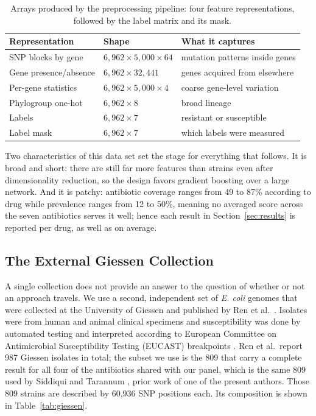 \documentclass[journal]{IEEEtran}
\begin{document}
\begin{table}[!tb]
\caption{Arrays produced by the preprocessing pipeline: four feature
representations, followed by the label matrix and its mask.}
\label{tab:views}
\centering
\footnotesize
\setlength{\tabcolsep}{2pt}
\renewcommand{\arraystretch}{1.05}
\begin{tabular}{|l|l|>{\raggedright\arraybackslash}p{2.0cm}|}
\hline
\rowcolor{headgrey}
\textbf{Representation} & \textbf{Shape} & \textbf{What it captures} \\ \hline
SNP blocks by gene    & $6{,}962 \times 5{,}000 \times 64$ & mutation patterns inside genes \\ \hline
Gene presence/absence & $6{,}962 \times 32{,}441$          & genes acquired from elsewhere \\ \hline
Per-gene statistics   & $6{,}962 \times 5{,}000 \times 4$  & coarse gene-level variation \\ \hline
Phylogroup one-hot    & $6{,}962 \times 8$                 & broad lineage \\ \hline
Labels                & $6{,}962 \times 7$                 & resistant or susceptible \\ \hline
Label mask            & $6{,}962 \times 7$                 & which labels were measured \\ \hline
\end{tabular}
\renewcommand{\arraystretch}{1.0}
\end{table}

Two characteristics of this data set set the stage for everything that follows. It
is broad and short: there are still far more features than strains even after
dimensionality reduction, so the design favors gradient boosting over a large
network. And it is patchy: antibiotic coverage ranges from 49 to 87\%
according to drug while prevalence ranges from 12 to 50\%, meaning no
averaged score across the seven antibiotics serves it well; hence each result in
Section~\ref{sec:results} is reported per drug, as well as on average.

\subsection{The External Giessen Collection}

A single collection does not provide an answer to the question of whether or not an
approach travels. We use a second, independent set of \textit{E. coli} genomes that
were collected at the University of Giessen and published by Ren et al.\
\cite{Ren2022}. Isolates were from human and animal clinical specimens and
susceptibility was done by automated testing and interpreted according to European
Committee on Antimicrobial Susceptibility Testing (EUCAST)
breakpoints \cite{eucast_breakpoints}. Ren et al.\ report 987 Giessen isolates in
total; the subset we use is the 809 that carry a complete result for all four of the
antibiotics shared with our panel, which is the same 809 used by Siddiqui and
Tarannum \cite{siddiqui2025amrensemble}, prior work of one of the present authors. Those 809 strains are described by 60,936 SNP
positions each. Its composition is shown in Table~\ref{tab:giessen}.
\end{document}

